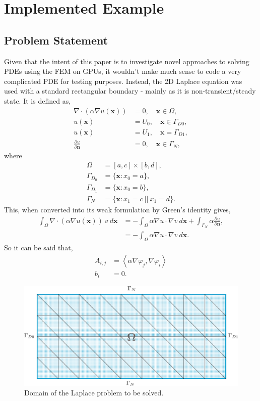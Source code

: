 \section{Implemented Example}

\subsection{Problem Statement}\label{problem}
	Given that the intent of this paper is to investigate novel approaches to solving PDEs using the FEM on GPUs, it wouldn't make much sense to code a very complicated PDE for testing purposes. Instead, the 2D Laplace equation was used with a standard rectangular boundary -  mainly as it is non-transient/steady state. It is defined as,
\begin{align}
	\nabla\cdot(\alpha\nabla u(\mathbf{x})) &= 0,\quad \mathbf{x}\in \Omega, \\
	u(\mathbf{x}) &= U_0,\quad \mathbf{x} \in \Gamma_{D0},\\
	u(\mathbf{x}) &= U_1,\quad \mathbf{x} = \Gamma_{D1},\\
	\frac{\partial u}{\partial \mathbf{n}} &= 0,\quad \mathbf{x} \in {\Gamma_N},
\end{align}
where
\begin{align*}
	\Omega &= [a,c]\times[b,d],\\
	\Gamma_{D_0} &= \{\mathbf{x} : x_0 = a\},\\
	\Gamma_{D_1} &= \{\mathbf{x} : x_0 = b\},\\
	\Gamma_N &= \{\mathbf{x} : x_1 = c~||~x_1 = d\}.
\end{align*}
This, when converted into its weak formulation by Green's identity gives,
\begin{align}
	\int_\Omega \nabla\cdot(\alpha\nabla u(\mathbf{x}))~v~d\mathbf{x} &= -\int_\Omega \alpha\nabla u \cdot \nabla v~d\mathbf{x} + \int_{\Gamma_N} \alpha \frac{\partial u}{\partial \mathbf{n}},\\
	&= -\int_\Omega \alpha\nabla u \cdot \nabla v~d\mathbf{x}.
\end{align}
So it can be said that,
\begin{align}
	A_{i,j} &= \left\langle \alpha \nabla \varphi_j, \nabla \varphi_i\right\rangle\label{lhs}\\
	b_i &= 0.
\end{align}
\begin{figure}
	\centering
	\includegraphics[width = 0.65\linewidth]{Figures/domain}
	\caption{Domain of the Laplace problem to be solved.}
	\label{fig:domain}
\end{figure}
